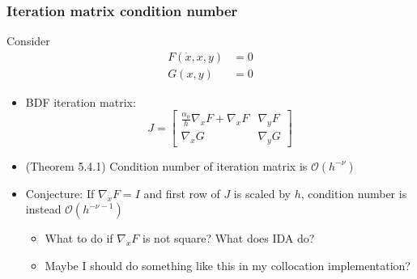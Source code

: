 \documentclass[]{beamer}
\begin{document}
\begin{frame}
\frametitle{Iteration matrix condition number}
Consider
\begin{align*}
F(\dot x, x, y) &= 0 \\
G(x, y) &= 0
\end{align*}
\begin{itemize}
\item
BDF iteration matrix:
\begin{equation}
J = \begin{bmatrix}
\frac{\alpha_0}{h} \nabla_{\dot x}F + \nabla_x F & \nabla_y F \\
\nabla_x G & \nabla_y G
\end{bmatrix}
\end{equation}
\item
(Theorem 5.4.1) Condition number of iteration matrix is $\mathcal{O}(h^{-\nu})$
\item
Conjecture: If $\nabla_{\dot x}F = I$ and first row of $J$ is scaled by $h$, condition number is instead $\mathcal{O}(h^{-\nu-1})$
\begin{itemize}
\item
What to do if $\nabla_{\dot x}F$ is not square? What does IDA do?
\item
Maybe I should do something like this in my collocation implementation?
\end{itemize}
\end{itemize}
\end{frame}
\end{document}
